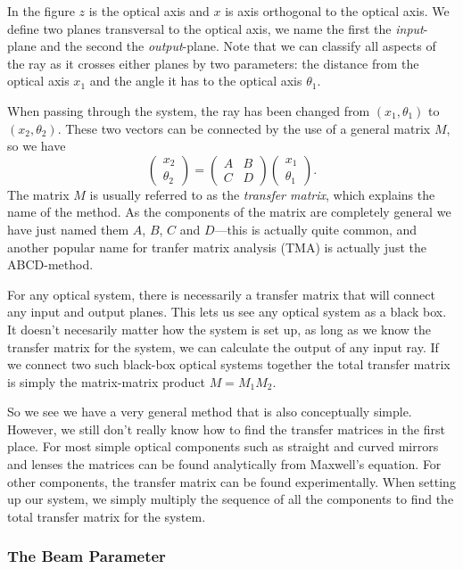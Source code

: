 \documentclass[a4paper, 11pt, notitlepage, english]{article}
\begin{document}
In the figure $z$ is the optical axis and $x$ is axis orthogonal to the optical axis. We define two planes transversal to the optical axis, we name the first the \emph{input}-plane and the second the \emph{output}-plane. Note that we can classify all aspects of the ray as it crosses either planes by two parameters: the distance from the optical axis $x_1$ and the angle it has to the optical axis $\theta_1$.

When passing through the system, the ray has been changed from $(x_1, \theta_1)$ to $(x_2, \theta_2)$. These two vectors can be connected by the use of a general matrix $M$, so we have
$$\begin{pmatrix}
	x_2 \\ \theta_2
\end{pmatrix} = 
\begin{pmatrix}
	A & B \\ C & D
\end{pmatrix}
\begin{pmatrix}
	x_1 \\ \theta_1
\end{pmatrix}.
$$
The matrix $M$ is usually referred to as the \emph{transfer matrix}, which explains the name of the method. As the components of the matrix are completely general we have just named them $A$, $B$, $C$ and $D$---this is actually quite common, and another popular name for tranfer matrix analysis (TMA) is actually just the ABCD-method.

For any optical system, there is necessarily a transfer matrix that will connect any input and output planes. This lets us see any optical system as a black box. It doesn't necesarily matter how the system is set up, as long as we know the transfer matrix for the system, we can calculate the output of any input ray. If we connect two such black-box optical systems together the total transfer matrix is simply the matrix-matrix product $M=M_1M_2$.

So we see we have a very general method that is also conceptually simple. However, we still don't really know how to find the transfer matrices in the first place. For most simple optical components such as straight and curved mirrors and lenses the matrices can be found analytically from Maxwell's equation. For other components, the transfer matrix can be found experimentally. When setting up our system, we simply multiply the sequence of all the components to find the total transfer matrix for the system.

\subsubsection{The Beam Parameter}
\end{document}
